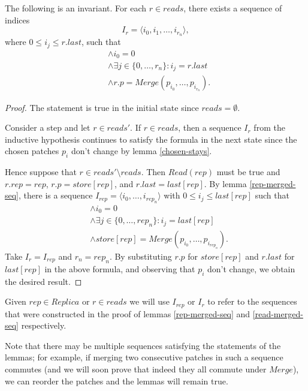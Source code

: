 \documentclass[12pt,a4paper,en]{pracamgr}
\begin{document}
\begin{lemma}\label{read-merged-seq}
    The following is an invariant. For each $r \in reads$, there exists a sequence of indices
    $$ I_r = \langle i_0, i_1, \dots, i_{r_n}\rangle , $$
    where $0 \le i_j \le r.last$, such that
    \begin{align*}
        & \land i_0 = 0\\
        & \land \exists j \in \{0, \dots, r_n\}: i_j = r.last\\
        & \land r.p = Merge(p_{i_0}, \dots, p_{i_{r_n}}).
    \end{align*}
\end{lemma}
\begin{proof}
    The statement is true in the initial state since $reads = \emptyset$.

    Consider a step and let $r \in reads'$. If $r \in reads$, then a sequence $I_r$ from the inductive hypothesis continues to satisfy the formula in the next state since the chosen patches $p_i$ don't change by lemma \ref{chosen-stays}.

    Hence suppose that $r \in reads' \setminus reads$. Then $Read(rep)$ must be true and $r.rep = rep$, $r.p = store[rep]$, and $r.last = last[rep]$. By lemma \ref{rep-merged-seq}, there is a sequence $I_{rep} = \langle i_0, \dots, i_{rep_n}\rangle$ with $0 \le i_j \le last[rep]$ such that
    \begin{align*}
        & \land i_0 = 0\\
        & \land \exists j \in \{0, \dots, rep_n\}: i_j = last[rep]\\
        & \land store[rep] = Merge(p_{i_0}, \dots, p_{i_{rep_n}}).
    \end{align*}
    Take $I_r = I_{rep}$ and $r_n = rep_n$. By substituting $r.p$ for $store[rep]$ and $r.last$ for $last[rep]$ in the above formula, and observing that $p_i$ don't change, we obtain the desired result.
\end{proof}

Given $rep \in Replica$ or $r \in reads$ we will use $I_{rep}$ or $I_r$ to refer to the sequences that were constructed in the proof of lemmas \ref{rep-merged-seq} and \ref{read-merged-seq} respectively.

Note that there may be multiple sequences satisfying the statements of the lemmas; for example, if merging two consecutive patches in such a sequence commutes (and we will soon prove that indeed they all commute under $Merge$), we can reorder the patches and the lemmas will remain true.
\end{document}
